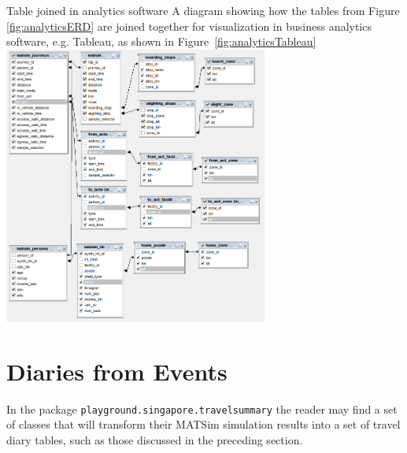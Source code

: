 \createfigure%
{Table joined in analytics software}%
{A diagram showing how the tables from Figure \ref{fig:analyticsERD} are joined together for visualization in business analytics software, e.g. Tableau, as shown in Figure~\ref{fig:analyticsTableau}}%
{\label{fig:analyticsFramework}}%
{\includegraphics[width=0.65\textwidth, angle=0]{extending/figures/businessanalytics/join}}%
{}


\section{Diaries from Events}
In the package \lstinline|playground.singapore.travelsummary| the reader may find a set of classes that will transform their MATSim simulation results into a set of travel diary tables, such as those discussed in the preceding section.





